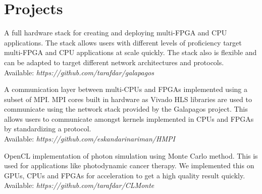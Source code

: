 \section{\sc Projects}

{
  A full hardware stack for creating and deploying multi-FPGA and CPU applications.
  The stack allows users with different levels of proficiency target multi-FPGA and CPU applications at scale quickly.
  The stack also is flexible and can be adapted to target different network architectures and protocols. 
\\  Available: \textit{https://github.com/tarafdar/galapagos}
}

{
 A communication layer between multi-CPUs and FPGAs implemented using a subset of MPI. MPI cores built in hardware as Vivado HLS libraries are used to communicate using the network stack provided by the Galapagos project. 
 This allows users to communicate amongst kernels implemented in CPUs and FPGAs by standardizing a protocol. 
\\ Available: \textit{https://github.com/eskandarinariman/HMPI}
}

{
    OpenCL implementation of photon simulation using Monte Carlo method.
    This is used for applications like photodynamic cancer therapy.
    We implemented this on GPUs, CPUs and FPGAs for acceleration to get a high quality result quickly. 
\\    Available: \textit{https://github.com/tarafdar/CLMonte}
}
